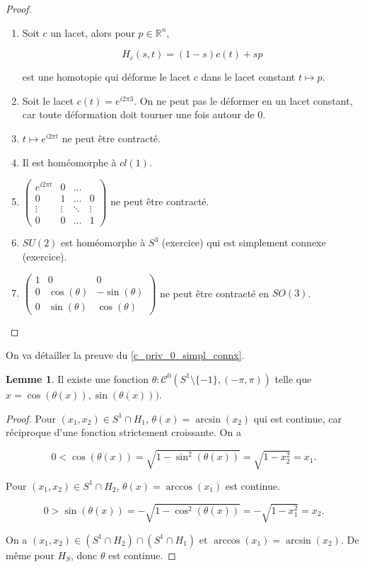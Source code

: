 \documentclass[french]{book}
\theoremstyle{definition}
\newtheorem*{protolemma}{Lemme}
\newenvironment{lemma}
    {\colorlet{shadecolor}{pink!15}\begin{shaded}\begin{protolemma}}
    {\end{protolemma}\end{shaded}}
\newcommand{\lesss}{<}
\newcommand{\less}{\lesss}
\newcommand{\biggg}{>}
\newcommand{\bg}{\biggg}
\begin{document}
\begin{proof}

  \

  \begin{enumerate}
    \item Soit \(c\) un lacet, alors pour \(p \in \mathbb{R}^n\),

    \[H_c(s,t) = (1-s)c(t)+sp\]

    est une homotopie qui déforme le lacet \(c\) dans le lacet constant \(t \longmapsto p\).
    \item Soit le lacet \(c(t) = e^{i 2 \pi 3}\). On ne peut pas le déformer en un lacet constant, car toute déformation doit tourner une fois autour de 0.
    \item \(t \longmapsto e^{i 2 \pi t}\) ne peut être contracté.
    \item Il est homéomorphe à \(cl(1)\).
    \item \(\begin{pmatrix}
    e^{i2 \pi t} & 0 & \dots & \\
    0 & 1 & \dots & 0 \\
    \vdots & \vdots & \ddots & \vdots \\
    0 & 0 & \dots & 1
    \end{pmatrix}\) ne peut être contracté.
    \item \(S U(2)\) est homéomorphe à \(S ^{3}\) (exercice) qui est simplement connexe (exercice).
    \item \(\begin{pmatrix}
    1 & 0 & 0 \\
    0 & \cos(\theta) & - \sin(\theta) \\
    0 & \sin(\theta) & \cos(\theta)
    \end{pmatrix}\) ne peut être contracté en \(SO(3)\).
  \end{enumerate}
\end{proof}

On va détailler la preuve du \ref{c_priv_0_simpl_connx}.

\begin{lemma}
  Il existe une fonction \(\theta : \mathcal{C}^0(S ^{1}\setminus \{ -1 \}, (- \pi, \pi))\) telle que \(x = \cos(\theta(x)), \sin(\theta(x)))\).
\end{lemma}

\begin{proof}
  Pour \((x_1,x_2)\in S ^{1}\cap H_1\), \(\theta(x) = \arcsin(x_2)\) qui est continue, car réciproque d'une fonction strictement croissante. On a

  \[0 \less \cos(\theta(x)) = \sqrt{1- \sin ^2(\theta(x))} = \sqrt{1 - x_2 ^2} = x_1.\]

  Pour \((x_1, x_2) \in S ^{1}\cap H_2\), \(\theta(x)= \arccos(x_1)\) est continue.

  \[0 \bg \sin(\theta(x)) = - \sqrt{1 - \cos ^2(\theta(x))} = -\sqrt{1-x_1 ^2} = x_2.\]

  On a \((x_1, x_2) \in (S ^{1}\cap H_2) \cap (S ^{1}\cap H_1)\) et \(\arccos(x_1) =\arcsin(x_2)\). De même pour \(H_S\), donc \(\theta\) est continue.
\end{proof}
\end{document}
